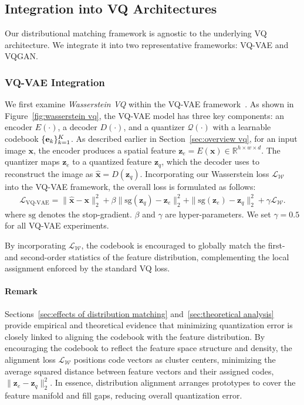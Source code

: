 \subsection{Integration into VQ Architectures}
Our distributional matching framework is agnostic to the underlying VQ architecture. We integrate it into two representative frameworks: VQ-VAE and VQGAN.

\subsubsection{VQ-VAE Integration} 
\label{sec:VQVAE}
We first examine \emph{Wasserstein VQ} within the VQ-VAE framework~\cite{Oord2017NeuralDR}. As shown in Figure~\ref{fig:wasserstein vq}, the VQ-VAE model has three key components: an encoder $E(\cdot)$, a decoder $D(\cdot)$, and a quantizer $\mathcal{Q}(\cdot)$ with a learnable codebook $\{\mathbf{e}_k\}_{k=1}^{K}$. As described earlier in Section~\ref{sec:overview vq}, for an input image $\bm{x}$, the encoder produces a spatial feature $\bm{z}_e = E(\bm{x}) \in \mathbb{R}^{h\times w \times d}$. The quantizer maps $\bm{z}_e$ to a quantized feature $\bm{z}_q$, which the decoder uses to reconstruct the image as $\bm{\hat{x}} = D(\bm{z}_q)$. Incorporating our Wasserstein loss $\mathcal{L}_{\mathcal{W}}$ into the VQ-VAE framework, the overall loss is formulated as follows:
\begin{align}
\label{eq:vqvae}
\mathcal{L}_{\text{VQ-VAE}} =\| \bm{\hat{x}} - \bm{x} \|^{2}_2 + \beta \| \textrm{sg}(\bm{z}_q)-\bm{z}_e \|^{2}_2 + \| \textrm{sg}(\bm{z}_e) -\bm{z}_q \|^{2}_2 + \gamma \mathcal{L}_{\mathcal{W}}.
\end{align} 
where $\textrm{sg}$ denotes the stop-gradient. $\beta$ and $\gamma$ are hyper-parameters. We set $\gamma=0.5$ for all VQ-VAE experiments.

By incorporating $\mathcal{L}_{\mathcal{W}}$, the codebook is encouraged to globally match the first- and second-order statistics of the feature distribution, complementing the local assignment enforced by the standard VQ loss.

\paragraph{Remark} 
Sections~\ref{sec:effects of distribution matching} and~\ref{sec:theoretical analysis} provide empirical and theoretical evidence that minimizing quantization error is closely linked to aligning the codebook with the feature distribution. By encouraging the codebook to reflect the feature space structure and density, the alignment loss $\mathcal{L}_{\mathcal{W}}$ positions code vectors as cluster centers, minimizing the average squared distance between feature vectors and their assigned codes, $\| \bm{z}_e - \bm{z}_q \|^{2}_2$. In essence, distribution alignment arranges prototypes to cover the feature manifold and fill gaps, reducing overall quantization error.

